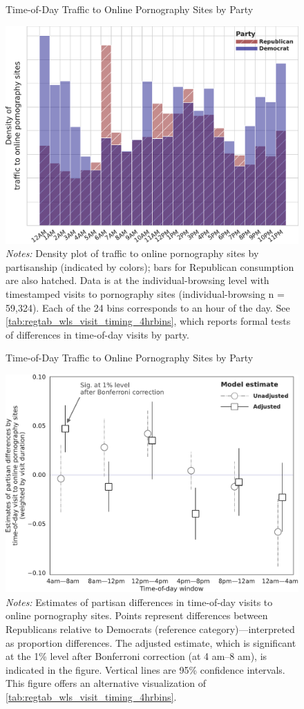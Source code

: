 \documentclass[12pt,twoside]{article}
\begin{document}
\begin{figure}[ht]
\centering
\caption{Time-of-Day Traffic to Online Pornography Sites by Party}
    \includegraphics[width=.75\linewidth]{figs/time-of-day-consumption-by-party.pdf}
\caption*{\footnotesize \emph{Notes:} 
        Density plot of traffic to online pornography sites by partisanship (indicated by colors); bars for Republican consumption are also hatched.
        Data is at the individual-browsing level with timestamped visits to pornography sites (individual-browsing n = 59,324).
        Each of the 24 bins corresponds to an hour of the day.
        See \cref{tab:regtab_wls_visit_timing_4hrbins}, which reports formal tests of differences in time-of-day visits by party.
	}
    \label{fig:time-of-day-consumption-by-party}
\end{figure}

\begin{figure}[!ht]
\centering
\caption{Time-of-Day Traffic to Online Pornography Sites by Party}
    \includegraphics[width=.85\linewidth]{figs/time-of-day-wls-estimates.pdf}
\caption*{\footnotesize \emph{Notes:} 
        Estimates of partisan differences in time-of-day visits to online pornography sites.
        Points represent differences between Republicans relative to Democrats (reference category)---interpreted as proportion differences.
        The adjusted estimate, which is significant at the 1\% level after Bonferroni correction (at 4 am--8 am), is indicated in the figure.
        Vertical lines are 95\% confidence intervals.
        This figure offers an alternative visualization of \cref{tab:regtab_wls_visit_timing_4hrbins}.
	}
    \label{fig:time-of-day-wls-estimates}
\end{figure}
\end{document}
